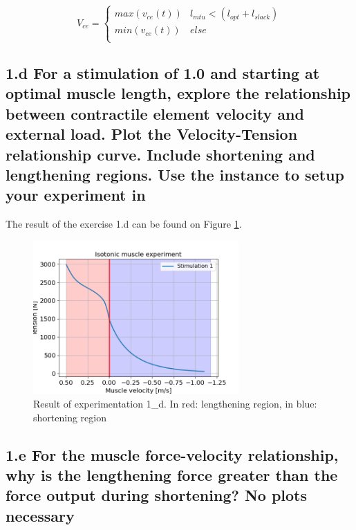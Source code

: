 \documentclass{cmc}
\begin{document}
\begin{equation}
  \label{eq:2}
 V_{ce} = \left\{
\begin{array}{ll}
      max(v_{ce}(t)) & l_{mtu} < (l_{opt} + l_{slack}) \\
      min(v_{ce}(t)) & else \\
\end{array}
\right.
\end{equation}

\subsection*{1.d For a stimulation of 1.0 and starting at optimal
  muscle length, explore the relationship between contractile element
  velocity and external load. Plot the Velocity-Tension relationship
  curve. Include shortening and lengthening regions. Use the
   instance
  to setup your experiment in }
  
    The result of the exercise 1.d can be found on Figure \ref{fig:ex_1d}.
    
    \begin{figure}[H]
      \centering \includegraphics[width=0.7\textwidth]{figures/1d.png}
      \caption{\label{fig:ex_1d} Result of experimentation 1\_d. In red: lengthening region, in blue: shortening region}
    \end{figure}
    

\subsection*{1.e For the muscle force-velocity relationship, why is
  the lengthening force greater than the force output during
  shortening? No plots necessary}
\end{document}

